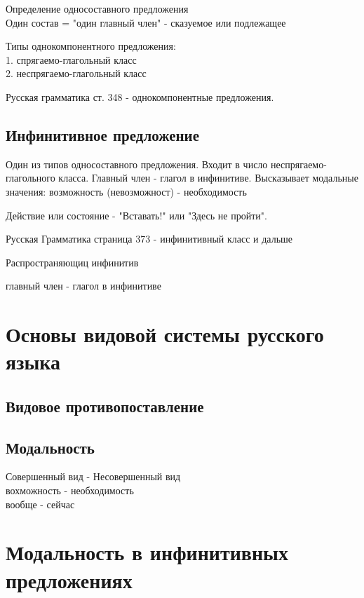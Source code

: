 \documentclass{article}
\begin{document}
Определение односоставного предложения  \\

Один состав = "один главный член" -  сказуемое или подлежащее



Типы однокомпонентного предложения: \\ 
	1. спрягаемо-глагольный класс \\
	2. неспрягаемо-глагольный класс

Русская грамматика ст. 348 - однокомпонентные предложения.

\subsection{Инфинитивное предложение}

Один из типов односоставного предложения. Входит в число неспрягаемо-глагольного класса. Главный член - глагол в инфинитиве. Высказывает модальные значения: возможность (невозможност) - необходимость 

Действие или состояние - "Вставать!" или "Здесь не пройти".

Русская Грамматика страница 373 - инфинитивный класс и дальше

Распространяющиц инфинитив

главный член - глагол в инфинитиве



\section{Основы видовой системы русского языка}

\subsection{Видовое противопоставление}

\subsection{Модальность}
	Совершенный вид -	Несовершенный вид \\
	вохможность 	- 	необходимость \\
	вообще 			-	сейчас \\


\section{Модальность в инфинитивных предложениях}
\end{document}
